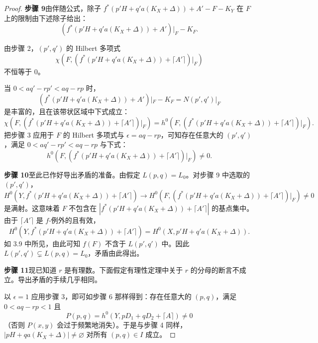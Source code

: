 \begin{proof}
\par\medskip\noindent\textbf{步骤 9}\quad 由伴随公式，除子 $f^*(p'H+q'a(K_X+\Delta))+A'-F-K_Y$ 在 $F$ 上的限制由下述除子给出：
\[
(f^*(p'H+q'a(K_X+\Delta))+A')|_F-K_F.
\]

由步骤 2，$(p',q')$ 的 Hilbert 多项式
\[
\chi\left(F,(f^*(p'H+q'a(K_X+\Delta))+\lceil A'\rceil)|_F\right)
\]
不恒等于 $0$。

当 $0<aq'-rp'<aq-rp$ 时，
\[
(f^*(p'H+q'a(K_X+\Delta))+A')|_F-K_F=N(p',q')|_F
\]
是丰富的，且在该带状区域中下式成立：
\[
\chi\left(F,(f^*(p'H+q'a(K_X+\Delta))+\lceil A'\rceil)|_F\right)=h^0\left(F,(f^*(p'H+q'a(K_X+\Delta))+\lceil A'\rceil)|_F\right).
\]
把步骤 3 应用于 $F$ 的 Hilbert 多项式与 $\epsilon=aq-rp$，可知存在任意大的 $(p',q')$，满足 $0<aq'-rp'<aq-rp$ 与下式：
\[
h^0\left(F,(f^*(p'H+q'a(K_X+\Delta))+\lceil A'\rceil)|_F\right)\neq 0.
\]

\par\medskip\noindent\textbf{步骤 10}\quad 至此已作好导出矛盾的准备。由假定 $L(p,q)=L_0$。对步骤 9 中选取的 $(p',q')$，
\[
H^0\left(Y,f^*(p'H+q'a(K_X+\Delta))+\lceil A'\rceil\right)\to H^0\left(F,(f^*(p'H+q'a(K_X+\Delta))+\lceil A'\rceil)|_F\right)\neq 0
\]
是满射。这意味着 $F$ 不包含在 $|f^*(p'H+q'a(K_X+\Delta))+\lceil A'\rceil|$ 的基点集中。由于 $\lceil A'\rceil$ 是 $f$-例外的且有效，
\[
H^0\left(Y,f^*(p'H+q'a(K_X+\Delta))+\lceil A'\rceil\right)=H^0\left(X,p'H+q'a(K_X+\Delta)\right).
\]
如 3.9 中所见，由此可知 $f(F)$ 不含于 $L(p',q')$ 中。因此 $L(p',q')\subsetneq L(p,q)=L_0$，矛盾由此得出。

\par\medskip\noindent\textbf{步骤 11}\quad 现已知道 $r$ 是有理数。下面假定有理性定理中关于 $r$ 的分母的断言不成立。导出矛盾的手续几乎相同。

以 $\epsilon=1$ 应用步骤 3，即可如步骤 6 那样得到：存在任意大的 $(p,q)$，满足 $0<aq-rp<1$ 且
\[
P(p,q)=h^0(Y,pD_1+qD_2+\lceil A\rceil)\neq 0
\]
（否则 $P(x,y)$ 会过于频繁地消失）。于是与步骤 4 同样，$|pH+qa(K_X+\Delta)|\neq\varnothing$ 对所有 $(p,q)\in I$ 成立。
\end{proof}
